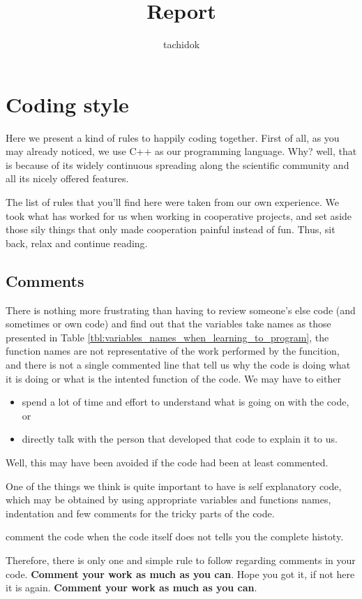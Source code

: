 \documentclass[12pt,a4paper,final]{report} %
\author{tachidok}
\title{Report}
\begin{document}


\chapter[Here]{Coding style}
Here we present a kind of rules to happily coding together. First of
all, as you may already noticed, we use C++ as our programming
language. Why? well, that is because of its widely continuous
spreading along the scientific community and all its nicely offered
features.

The list of rules that you'll find here were taken from our own
experience. We took what has worked for us when working in cooperative
projects, and set aside those sily things that only made cooperation
painful instead of fun. Thus, sit back, relax and continue reading.

\section{Comments}
There is nothing more frustrating than having to review someone's else
code (and sometimes or own code) and find out that the variables take
names as those presented in Table
\ref{tbl:variables_names_when_learning_to_program}, the function names
are not representative of the work performed by the funcition, and
there is not a single commented line that tell us why the code is
doing what it is doing or what is the intented function of the
code. We may have to either 
\begin{itemize}
\item spend a lot of time and effort to understand what is going on
  with the code, or
\item directly talk with the person that developed that code to
  explain it to us.
\end{itemize}
Well, this may have been avoided if the code had been at least
commented.

One of the things we think is quite important to have is self
explanatory code, which may be obtained by using appropriate variables
and functions names, indentation and few comments for the tricky parts
of the code.

comment the code when the code itself does not tells you the complete
histoty.

Therefore, there is only one and simple rule to follow regarding
comments in your code. \textbf{Comment your work as much as you
  can}. Hope you got it, if not here it is again. \textbf{Comment
  your work as much as you can}.
\end{document}
